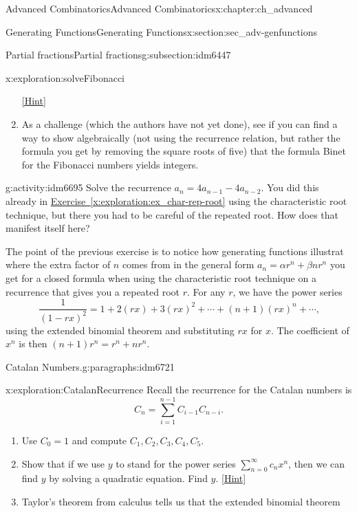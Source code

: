 \documentclass[oneside,10pt,]{book}
\numberwithin{equation}{chapter}
\begin{document}
\begin{chapterptx}{Advanced Combinatorics}{}{Advanced Combinatorics}{}{}{x:chapter:ch_advanced}
\begin{sectionptx}{Generating Functions}{}{Generating Functions}{}{}{x:section:sec_adv-genfunctions}
\begin{subsectionptx}{Partial fractions}{}{Partial fractions}{}{}{g:subsection:idm6447}
\begin{exploration}{}{x:exploration:solveFibonacci}
\begin{enumerate}[font=\bfseries,label=(\alph*),ref=\alph*]
\space\hspace*{0pt}\hfill{\tiny\hyperlink{g:hint:idm6677-back}{[Hint]}}\item{}As a challenge (which the authors have not yet done), see if you can find a way to show algebraically (not using the recurrence relation, but rather the formula you get by removing the square roots of five) that the formula Binet for the Fibonacci numbers yields integers.%
\end{enumerate}
\end{exploration}
\begin{activity}{}{g:activity:idm6695}%
Solve the recurrence \(a_n= 4a_{n-1} - 4a_{n-2}\).  You did this already in \hyperref[x:exploration:ex_char-rep-root]{Exercise~\ref{x:exploration:ex_char-rep-root}} using the characteristic root technique, but there you had to be careful of the repeated root.  How does that manifest itself here?%
\end{activity}
The point of the previous exercise is to notice how generating functions illustrat where the extra factor of \(n\) comes from in the general form \(a_n = \alpha r^n + \beta n r^n\) you get for a closed formula when using the characteristic root technique on a recurrence that gives you a repeated root \(r\).  For any \(r\), we have the power series%
\begin{equation*}
\frac{1}{(1-rx)^2} = 1 + 2(rx) + 3(rx)^2 + \cdots + (n+1)(rx)^n + \cdots\text{,}
\end{equation*}
using the extended binomial theorem and substituting \(rx\) for \(x\).  The coefficient of \(x^n\) is then \((n+1)r^n = r^n + nr^n\).%
\begin{paragraphs}{Catalan Numbers.}{g:paragraphs:idm6721}%
\begin{exploration}{}{x:exploration:CatalanRecurrence}%
Recall the recurrence for the Catalan numbers is%
\begin{equation*}
C_n = \sum_{i=1}^{n-1} C_{i-1}C_{n-i}\text{.}
\end{equation*}
%
\begin{enumerate}[font=\bfseries,label=(\alph*),ref=\alph*]
\item{}Use \(C_0 = 1\) and compute \(C_1, C_2, C_3, C_4, C_5\).%
\item{}Show that if we use \(y\) to stand for the power series \(\sum_{n=0}^\infty c_nx^n\), then we can find \(y\) by solving a quadratic equation. Find \(y\).%
\space\hspace*{0pt}\hfill{\tiny\hyperlink{g:hint:idm6739-back}{[Hint]}}\item{}Taylor's theorem from calculus tells us that the extended binomial theorem%

\end{enumerate}
\end{exploration}
\end{paragraphs}
\end{subsectionptx}
\end{sectionptx}
\end{chapterptx}
\end{document}
